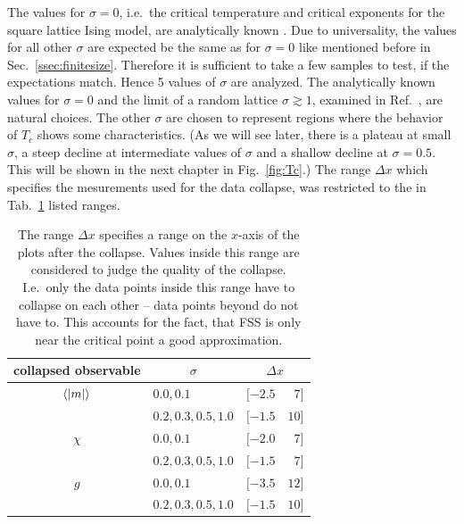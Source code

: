     The values for \(\sigma = 0\), i.e.\ the critical temperature and
    critical exponents for the square lattice Ising model,
    are analytically known \cite{Pelissetto2002}. Due to universality, the
    values for all other \(\sigma\) are expected be the same as for
    \(\sigma = 0\) like mentioned before in Sec.\ \ref{ssec:finitesize}.
    Therefore it is sufficient to take a few samples to test, if the
    expectations match. Hence 5 values of \(\sigma\) are analyzed.
    The analytically known values for \(\sigma = 0\) and the
    limit of a random lattice \(\sigma \gtrsim 1\), examined in
    Ref.\ \cite{Janke1994}, are natural choices.
    The other \(\sigma\) are chosen to represent regions where the behavior of
    \(T_c\) shows some characteristics. (As we will see later, there is a plateau at small
    \(\sigma\), a steep decline at intermediate values of \(\sigma\) and a shallow
    decline at \(\sigma = 0.5\). This will be shown in the next
    chapter in Fig.\ \ref{fig:Tc}.)
    The range \(\Delta x\) which specifies the mesurements used for the
    data collapse, was restricted to the in Tab.\ \ref{tab:FSS_range}
    listed ranges.
    \begin{table}[htbp]
        \center
        \begin{tabular}{c l l@{, }r}
            \toprule
            collapsed observable & \multicolumn{1}{c}{\(\sigma\) }   & \multicolumn{2}{c}{\(\Delta x\)}\\
            \midrule
            \(\left< \left\vert m\right\vert \right>\)    & \(0.0, 0.1\)                      & \([-2.5\) & \( 7]\)\\
                                 & \(0.2, 0.3, 0.5, 1.0\)           & \([-1.5\) & \(10]\)\\
            \(\chi\)             & \(0.0, 0.1\)                      & \([-2.0\) & \( 7]\)\\
                                 & \(0.2, 0.3, 0.5, 1.0\)           & \([-1.5\) & \( 7]\)\\
            \(g\)                & \(0.0, 0.1\)                      & \([-3.5\) & \(12]\)\\
                                 & \(0.2, 0.3, 0.5, 1.0\)           & \([-1.5\) & \(10]\)\\
            \bottomrule
        \end{tabular}
        \caption[Ranges of the Data Collapse]{
            The range \(\Delta x\) specifies a range on the \(x\)-axis of
            the plots after the collapse. Values inside this range are
            considered to judge the quality of the collapse. I.e.\ only
            the data points inside this range have to collapse on each
            other -- data points beyond do not have to. This accounts
            for the fact, that FSS is only near the critical point a good
            approximation.
        }
        \label{tab:FSS_range}
    \end{table}\\
